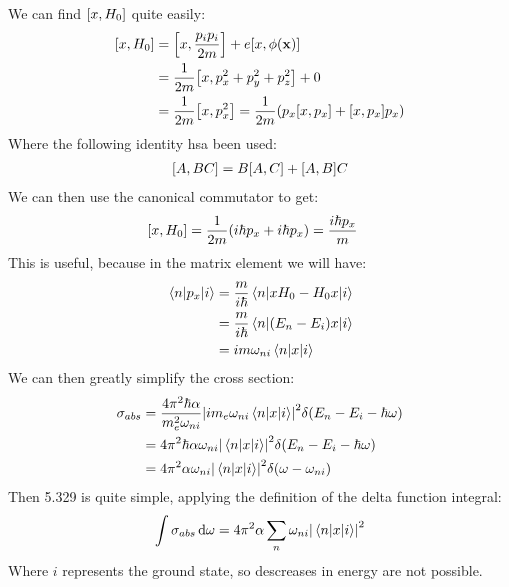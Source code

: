 \documentclass[12pt]{article}
\begin{document}
We can find $\comm{x}{H_0}$ quite easily:
\begin{align*}
  \comm{x}{H_0}&=\comm{x}{\frac{p_ip_i}{2m}}+e\comm{x}{\phi(\vb{x})}\\
  &=\frac1{2m}\comm{x}{p_x^2+p_y^2+p_z^2}+0\\
  &=\frac1{2m}\comm{x}{p_x^2}=\frac1{2m}\qty(p_x\comm{x}{p_x}+\comm{x}{p_x}p_x)
\end{align*}
Where the following identity hsa been used:
\begin{align*}
  \comm{A}{BC}=B\comm{A}{C}+\comm{A}{B}C
\end{align*}
We can then use the canonical commutator to get:
\begin{align*}
  \comm{x}{H_0}&=\frac1{2m}\qty(i\hbar p_x+i\hbar p_x)
  =\frac{i\hbar p_x}{m}
\end{align*}
This is useful, because in the matrix element we will have:
\begin{align*}
  \mel{n}{p_x}{i}&=\frac{m}{i\hbar}\mel{n}{xH_0-H_0x}{i}\\
  &=\frac{m}{i\hbar}\mel{n}{(E_n-E_i)x}{i}\\
  &=im\omega_{ni}\mel{n}{x}{i}
\end{align*}
We can then greatly simplify the cross section:
\begin{align*}
  \sigma_{abs}&=\frac{4\pi^2\hbar\alpha}{m_e^2\omega_{ni}}
  \abs{im_e\omega_{ni}\mel{n}{x}{i}}^2
  \delta(E_n-E_i-\hbar\omega)\\
  &=4\pi^2\hbar\alpha\omega_{ni}\abs{\mel{n}{x}{i}}^2
  \delta(E_n-E_i-\hbar\omega)\\
  &=4\pi^2\alpha\omega_{ni}\abs{\mel{n}{x}{i}}^2
  \delta(\omega-\omega_{ni})
\end{align*}
Then 5.329 is quite simple, applying the definition of the delta function integral:
\begin{align*}
  \int\sigma_{abs}\dd{\omega}=
  4\pi^2\alpha\sum_{n}\omega_{ni}\abs{\mel{n}{x}{i}}^2
\end{align*}
Where $i$ represents the ground state, so descreases in energy are not possible.
\end{document}
